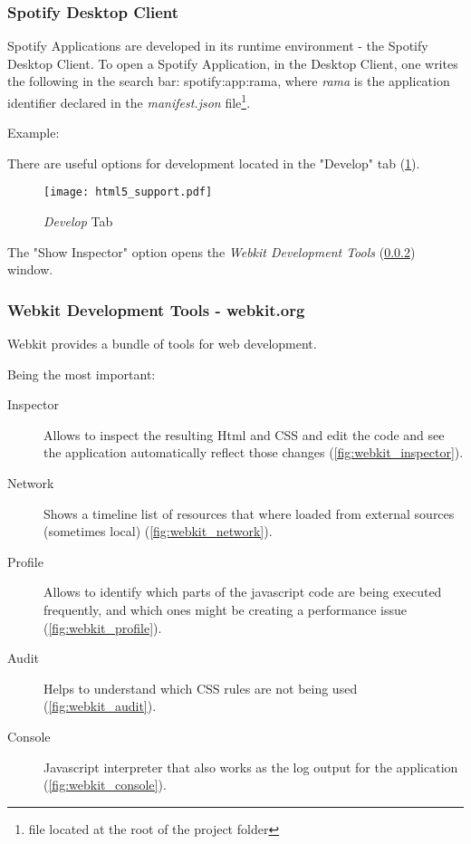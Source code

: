 
    \subsubsection{Spotify Desktop Client} %
    \label{ssub:subsection_name}
      Spotify Applications are developed in its runtime environment - the Spotify Desktop Client.
      To open a Spotify Application, in the Desktop Client, one writes the following in the search bar: spotify:app:rama, where \emph{rama} is the application identifier declared in the \emph{manifest.json} file\footnote{file located at the root of the project folder}.

      Example:

      

      There are useful options for development located in the "Develop" tab (\ref{fig:html5_support}).

      \begin{figure}[H]
        \begin{center}
          \texttt{[image: html5\_support.pdf]}
        \end{center}
        \caption{\emph{Develop} Tab}
        \label{fig:html5_support}
      \end{figure}

      The "Show Inspector" option opens the \emph{Webkit Development Tools} (\ref{ssub:webkit_tools}) window.

    \subsubsection{Webkit Development Tools - webkit.org} %
    \label{ssub:webkit_tools}

      Webkit provides a bundle of tools for web development.

      Being the most important:

      \begin{description}
        \item[Inspector] Allows to inspect the resulting Html and CSS and edit the code and see the application automatically reflect those changes (\ref{fig:webkit_inspector}).
        \item[Network] Shows a timeline list of resources that where loaded from external sources (sometimes local) (\ref{fig:webkit_network}).
        \item[Profile] Allows to identify which parts of the javascript code are being executed frequently, and which ones might be creating a performance issue (\ref{fig:webkit_profile}).
        \item[Audit] Helps to understand which CSS rules are not being used (\ref{fig:webkit_audit}).
        \item[Console] Javascript interpreter that also works as the log output for the application (\ref{fig:webkit_console}).
      \end{description}

